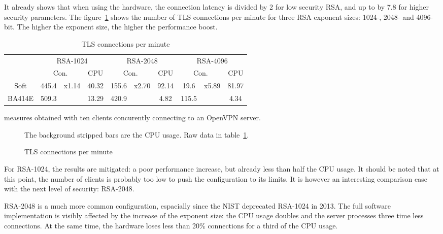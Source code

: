 It already shows that when using the hardware, the connection latency is divided by 2 for low security RSA, and up to by 7.8 for higher security parameters.
The figure~\ref{fig:openvpn-tls-bench} shows the number of TLS connections per minute for three RSA exponent sizes: 1024-, 2048- and 4096-bit.
The higher the exponent size, the higher the performance boost.


\begin{table}[ht]
\center
\small
\begin{tabular}{l|c|c|c|c|c|c|c|c|c|} \cline{2-10}
 & \multicolumn{3}{c|}{RSA-1024} & \multicolumn{3}{c|}{RSA-2048} & \multicolumn{3}{c|}{RSA-4096} \\ \cline{2-10}
 & \multicolumn{2}{c|}{Con.} & CPU & \multicolumn{2}{c|}{Con.} & CPU & \multicolumn{2}{|c|}{Con.} & CPU \\ \hline
\multicolumn{1}{|c|}{Soft} & 445.4 & \multirow{2}{*}{x1.14} & 40.32 & 155.6& \multirow{2}{*}{x2.70}  & 92.14 & 19.6& \multirow{2}{*}{x5.89}  & 81.97 \\ \cline{1-2}\cline{4-5}\cline{7-8}\cline{10-10}
\multicolumn{1}{|c|}{BA414E} & 509.3 & & 13.29 & 420.9 & & 4.82 & 115.5 & & 4.34 \\ \hline
\end{tabular}
\caption{TLS connections per minute}{measures obtained with ten clients concurently connecting to an OpenVPN server.}
\label{tab:tls-con}
\end{table}

\begin{figure}[ht]
\center

\caption{TLS connections per minute}{The background stripped bars are the CPU usage. Raw data in table~\ref{tab:tls-con}.}
\label{fig:openvpn-tls-bench}
\end{figure}


\noindent For RSA-1024, the results are mitigated: a poor performance increase, but already less than half the CPU usage.
It should be noted that at this point, the number of clients is probably too low to push the configuration to its limits.
It is however an interesting comparison case with the next level of security: RSA-2048.

\noindent RSA-2048 is a much more common configuration, espacially since the NIST deprecated RSA-1024 in 2013.
The full software implementation is visibly affected by the increase of the exponent size: the CPU usage doubles and the server processes three time less connections.
At the same time, the hardware loses less than 20\% connections for a third of the CPU usage.

